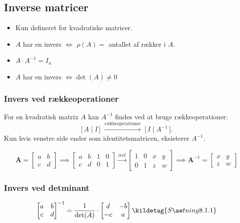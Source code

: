 
\subsection{Inverse matricer}
\begin{itemize}
    \item Kun defineret for kvadratiske matricer.
    \item $A$ har en invers $\iff$ $\rho(A) =$ antallet af rækker i $A$.
    \item $A \cdot A^{-1}=I_n$ \hfill {}
    \item $A$ har en invers $\iff \det(A) \neq 0$ \hfill {}
\end{itemize}



\subsubsection{Invers ved rækkeoperationer}
For en kvadratisk matrix $A$ kan $A^{-1}$ findes ved at bruge rækkeoperationer:
\[
\bigl[\,A \mid I\,\bigr]
\;\xrightarrow{\text{rækkeoperationer}}\;
\bigl[\,I \mid A^{-1}\,\bigr].
\]
Kun hvis venstre side ender som identitetsmatricen, eksisterer $A^{-1}$.

\[
    \mathbf{A}=
    \begin{bmatrix}
        a & b \\
        c & d
    \end{bmatrix}
    \implies
    \begin{bmatrix}
        a & b & 1 & 0 \\
        c & d & 0 & 1
    \end{bmatrix}
    \xrightarrow{\text{rref}}
    \begin{bmatrix}
        1 & 0 & x & y \\
        0 & 1 & z & w
    \end{bmatrix}
    \implies
    \mathbf{A}^{-1}=
    \begin{bmatrix}
        x & y \\
        z & w
    \end{bmatrix}
\]


\subsubsection{Invers ved detminant}
\[
\begin{bmatrix}
    a & b \\
    c & d
\end{bmatrix}
^{-1}
=
\frac{1}{\det(A)} \cdot
\begin{bmatrix}
    d & -b \\
    -c & a
\end{bmatrix}
\kildetag{Sætning 8.1.1}
\]

